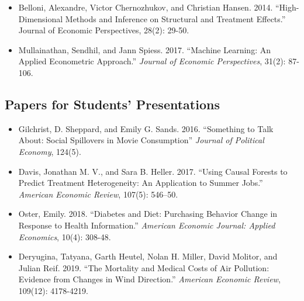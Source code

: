 \documentclass[a4paper,french,11pt]{article}
\begin{document}
\begin{itemize}
	 \item Belloni, Alexandre, Victor Chernozhukov, and Christian Hansen. 2014. ``High-Dimensional Methods and Inference on Structural and Treatment Effects.'' Journal of Economic Perspectives, 28(2): 29-50.
	 \item Mullainathan, Sendhil, and Jann Spiess. 2017. ``Machine Learning: An Applied Econometric Approach.'' \textit{Journal of Economic Perspectives}, 31(2): 87-106.
\end{itemize}

\subsection{Papers for Students' Presentations}

\begin{itemize}
	\item Gilchrist, D. Sheppard, and Emily G. Sands. 2016. ``Something to Talk About: Social Spillovers in Movie Consumption'' \textit{Journal of Political Economy}, 124(5).
	\item Davis, Jonathan M. V., and Sara B. Heller. 2017. ``Using Causal Forests to Predict Treatment Heterogeneity: An Application to Summer Jobs.'' \textit{American Economic Review}, 107(5): 546–50.
	\item Oster, Emily. 2018. ``Diabetes and Diet: Purchasing Behavior Change in Response to Health Information.'' \textit{American Economic Journal: Applied Economics}, 10(4): 308-48.
	\item Deryugina, Tatyana, Garth Heutel, Nolan H. Miller, David Molitor, and Julian Reif. 2019. ``The Mortality and Medical Costs of Air Pollution: Evidence from Changes in Wind Direction.'' \textit{American Economic Review}, 109(12): 4178-4219.
\end{itemize}
\end{document}
